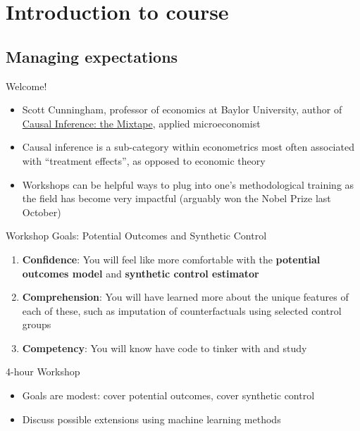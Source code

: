 \documentclass{beamer}
\begin{document}




\section{Introduction to course}

\subsection{Managing expectations}

\begin{frame}{Welcome!}

  \begin{itemize}
	\item Scott Cunningham, professor of economics at Baylor University, author of \underline{Causal Inference: the Mixtape}, applied microeconomist 
	\item Causal inference is a sub-category within econometrics most often associated with ``treatment effects'', as opposed to economic theory
	\item Workshops can be helpful ways to plug into one's methodological training as the field has become very impactful (arguably won the Nobel Prize last October)
  \end{itemize}

\end{frame}


\begin{frame}{Workshop Goals: Potential Outcomes and Synthetic Control}

  \begin{enumerate}
    \item \textbf{Confidence}: You will feel like more comfortable with the \textbf{potential outcomes model} and \textbf{synthetic control estimator}
    \item \textbf{Comprehension}: You will have learned more about the unique features of each of these, such as imputation of counterfactuals using selected control groups
    \item \textbf{Competency}: You will know have code to tinker with and study
  \end{enumerate}

\end{frame}

\begin{frame}{4-hour Workshop}

  \begin{itemize}
    \item Goals are modest: cover potential outcomes, cover synthetic control
    \item Discuss possible extensions using machine learning methods
  \end{itemize}

\end{frame}
\end{document}
